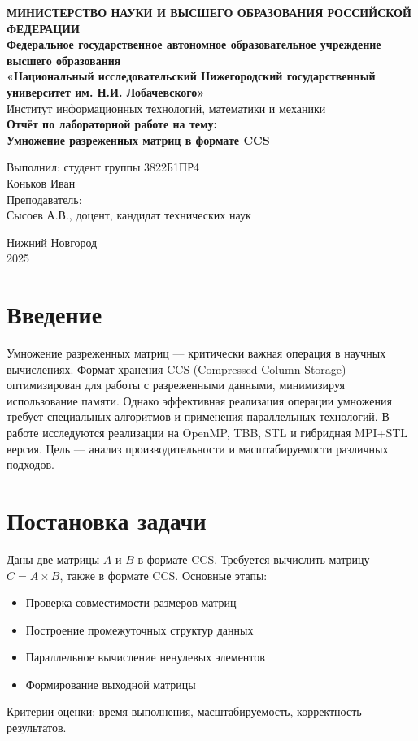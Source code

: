 \documentclass[a4paper,12pt]{article}
\begin{document}
\begin{titlepage}
\begin{center}
\textbf{МИНИСТЕРСТВО НАУКИ И ВЫСШЕГО ОБРАЗОВАНИЯ РОССИЙСКОЙ ФЕДЕРАЦИИ} \\[0.5cm]
\textbf{Федеральное государственное автономное образовательное учреждение высшего образования} \\[0.5cm]
\textbf{«Национальный исследовательский Нижегородский государственный университет им. Н.И. Лобачевского»} \\[0.5cm]
Институт информационных технологий, математики и механики \\
\vfill
{\Large
\textbf{Отчёт по лабораторной работе на тему:} \\[0.5cm]
\textbf{Умножение разреженных матриц в формате CCS} \\
}
\vfill
\begin{flushright}
Выполнил: студент группы 3822Б1ПР4 \\
Коньков Иван \\
\vspace{1cm}
Преподаватель: \\
Сысоев А.В., доцент, кандидат технических наук \\
\end{flushright}
\vfill
Нижний Новгород \\
2025
\end{center}
\end{titlepage}

\tableofcontents
\newpage

\section{Введение}
Умножение разреженных матриц — критически важная операция в научных вычислениях. Формат хранения CCS (Compressed Column Storage) оптимизирован для работы с разреженными данными, минимизируя использование памяти. Однако эффективная реализация операции умножения требует специальных алгоритмов и применения параллельных технологий. В работе исследуются реализации на OpenMP, TBB, STL и гибридная MPI+STL версия. Цель — анализ производительности и масштабируемости различных подходов.

\section{Постановка задачи}
Даны две матрицы \( A \) и \( B \) в формате CCS. Требуется вычислить матрицу \( C = A \times B \), также в формате CCS. Основные этапы:
\begin{itemize}
\item Проверка совместимости размеров матриц
\item Построение промежуточных структур данных
\item Параллельное вычисление ненулевых элементов
\item Формирование выходной матрицы
\end{itemize}
Критерии оценки: время выполнения, масштабируемость, корректность результатов.
\end{document}
